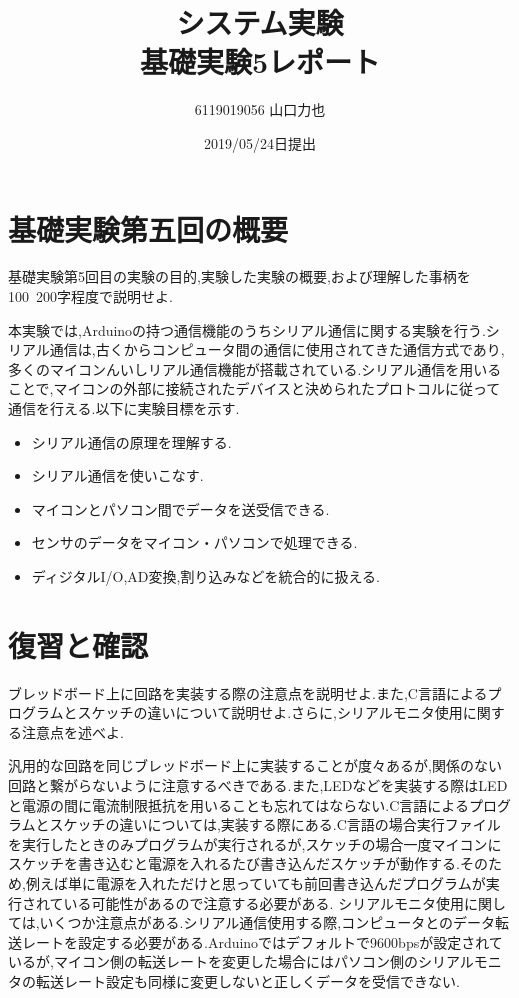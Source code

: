 \documentclass{jarticle}
\title{{システム実験}\\基礎実験5レポート}
\author{6119019056 山口力也}
\date{2019/05/24日提出}
\begin{document}
\maketitle

\section{基礎実験第五回の概要}
基礎実験第5回目の実験の目的,実験した実験の概要,および理解した事柄を100~200字程度で説明せよ.

本実験では,Arduinoの持つ通信機能のうちシリアル通信に関する実験を行う.シリアル通信は,古くからコンピュータ間の通信に使用されてきた通信方式であり,多くのマイコンんいしリアル通信機能が搭載されている.シリアル通信を用いることで,マイコンの外部に接続されたデバイスと決められたプロトコルに従って通信を行える.以下に実験目標を示す.
\begin{itemize}
\item シリアル通信の原理を理解する.
\item シリアル通信を使いこなす.
\item マイコンとパソコン間でデータを送受信できる.
\item センサのデータをマイコン・パソコンで処理できる.
\item ディジタルI/O,AD変換,割り込みなどを統合的に扱える.

\end{itemize}

\section{復習と確認}
ブレッドボード上に回路を実装する際の注意点を説明せよ.また,C言語によるプログラムとスケッチの違いについて説明せよ.さらに,シリアルモニタ使用に関する注意点を述べよ.

汎用的な回路を同じブレッドボード上に実装することが度々あるが,関係のない回路と繋がらないように注意するべきである.また,LEDなどを実装する際はLEDと電源の間に電流制限抵抗を用いることも忘れてはならない.C言語によるプログラムとスケッチの違いについては,実装する際にある.C言語の場合実行ファイルを実行したときのみプログラムが実行されるが,スケッチの場合一度マイコンにスケッチを書き込むと電源を入れるたび書き込んだスケッチが動作する.そのため,例えば単に電源を入れただけと思っていても前回書き込んだプログラムが実行されている可能性があるので注意する必要がある.
シリアルモニタ使用に関しては,いくつか注意点がある.シリアル通信使用する際,コンピュータとのデータ転送レートを設定する必要がある.Arduinoではデフォルトで9600bpsが設定されているが,マイコン側の転送レートを変更した場合にはパソコン側のシリアルモニタの転送レート設定も同様に変更しないと正しくデータを受信できない.
\end{document}
